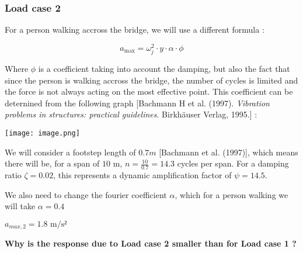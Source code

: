 \hypertarget{load-case-2}{%
\subsubsection{Load case 2}\label{load-case-2}}

For a person walking accross the bridge, we will use a different formula
:

\[
a_{\max }=\omega_j^2 \cdot y \cdot \alpha \cdot \phi
\]

Where \(\phi\) is a coefficient taking into account the damping, but
also the fact that since the person is walking accross the bridge, the
number of cycles is limited and the force is not always acting on the
most effective point. This coefficient can be deternined from the
following graph {[}Bachmann H et al. (1997). \emph{Vibration problems in
structures: practical guidelines}. Birkhäuser Verlag, 1995.{]} :

\texttt{[image: image.png]}

We will consider a footstep length of \(0.7 m\) {[}Bachmann et al.
(1997){]}, which means there will be, for a span of \(10 \text{ m}\),
\(n = \frac{10}{0.7} = 14.3\) cycles per span. For a damping ratio
\(\zeta = 0.02\), this represents a dynamic amplification factor of
\(\psi = 14.5\).

We also need to change the fourier coefficient \(\alpha\), which for a
person walking we will take \(\alpha = 0.4\)

\begin{Shaded}
\begin{Highlighting}[]
\OperatorTok{=} 
\OperatorTok{=}

\OperatorTok{=}\OperatorTok{**} \OperatorTok{*}\OperatorTok{*} \OperatorTok{*}\OperatorTok{*}
\CharTok{\{\{}\SpecialCharTok{\{}\SpecialStringTok{ }\CharTok{\textbackslash{}\textbackslash{}}\CharTok{\{\{}\NormalTok{))}
\end{Highlighting}
\end{Shaded}

$a_{max, 2} = 1.8 \text{ m/s²}$

\textbf{Why is the response due to Load case 2 smaller than for Load
case 1 ?}

